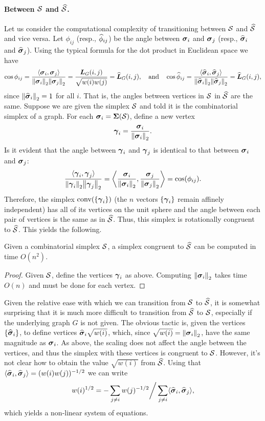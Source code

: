 \paragraph{Between \texorpdfstring{$\mathcal{S}$}{the combinatorial} and \texorpdfstring{$\widehat{\mathcal{S}}$}{normalized simplex}.}
Let us consider the computational complexity of transitioning between $\mathcal{S}$ and $\widehat{\mathcal{S}}$ and vice versa. Let $\phi_{ij}$ (resp., $\widehat{\phi}_{ij}$) be the angle between $\vb*{\sigma}_i$ and $\vb*{\sigma}_j$ (resp., $\widehat{\vb*{\sigma}}_i$ and $\widehat{\vb*{\sigma}}_j$). Using the typical formula for the dot product in Euclidean space we have
\begin{equation*}
\cos\phi_{ij} = \frac{\langle \vb*{\sigma}_i,\vb*{\sigma}_j\rangle }{\norm{\vb*{\sigma}_i}_2\norm{\vb*{\sigma}_j}_2} = \frac{\vb*{L}_G(i,j)}{\sqrt{w(i)w(j)}} = \widehat{\vb*{L}}_G(i,j), \quad\text{and}\quad \cos\widehat{\phi}_{ij} = \frac{\langle \widehat{\vb*{\sigma}}_i,\widehat{\vb*{\sigma}}_j\rangle }{\norm{\widehat{\vb*{\sigma}}_i}_2\norm{\widehat{\vb*{\sigma}}_j}_2} = \widehat{\vb*{L}}_G(i,j),
\end{equation*}
since  $\norm{\widehat{\vb*{\sigma}}_i}_2=1$ for all $i$. 
That is, the angles between vertices in $\mathcal{S}$ in $\widehat{\mathcal{S}}$ are the same. Suppose we are given the simplex $\mathcal{S}$ and told it is the combinatorial simplex of a graph. For each $\vb*{\sigma}_i = \boldsymbol{\Sigma}(\mathcal{S})$, define a new vertex 
\[\vb*{\gamma}_i = \frac{\vb*{\sigma}_i}{\norm{\vb*{\sigma}_i}_2}.\]
Is it evident that the angle between $\vb*{\gamma}_i$ and $\vb*{\gamma}_j$ is identical to that between $\vb*{\sigma}_i$ and $\vb*{\sigma}_j$: 
\begin{equation*}
\frac{\langle \vb*{\gamma}_i,\vb*{\gamma}_j\rangle}{\norm{\vb*{\gamma}_i}_2\norm{\vb*{\gamma}_j}_2} = \bigg\langle \frac{\vb*{\sigma}_i}{\norm{\vb*{\sigma}_i}_2},\frac{\vb*{\sigma}_j}{\norm{\vb*{\sigma}_j}_2}\bigg\rangle = \cos(\phi_{ij}).
\end{equation*}
 Therefore, the simplex  $\textnormal{conv}(\{\vb*{\gamma}_i\})$ (the $n$ vectors $\{\vb*{\gamma}_i\}$ remain affinely independent) has all of its vertices on the unit sphere and the angle  between each pair of vertices is the  same as in $\widehat{\mathcal{S}}$. Thus, this simplex is rotationally congruent  to $\widehat{\mathcal{S}}$. This yields the following.

\begin{lemma}
	Given a combinatorial simplex $\mathcal{S}$, a simplex congruent to $\widehat{\mathcal{S}}$ can be computed in time $O(n^2)$. 
\end{lemma}
\begin{proof}
	Given $\mathcal{S}$, define the vertices $\vb*{\gamma}_i$ as above. Computing $\norm{\vb*{\sigma}_i}_2$ takes time $O(n)$ and must be done for each vertex. 
\end{proof}

Given the relative ease with which we can transition from $\mathcal{S}$ to $\widehat{\mathcal{S}}$, it is somewhat surprising that it is much more difficult to transition from $\widehat{\mathcal{S}}$ to  $\mathcal{S}$, especially if the underlying graph $G$ is not given. The obvious tactic is, given the vertices $\{\widehat{\vb*{\sigma}}_i\}$, to define vertices $\widehat{\vb*{\sigma}}_i \sqrt{w(i)}$, which, since $\sqrt{w(i)}=\norm{\vb*{\sigma}_i}_2$, have the same magnitude as $\vb*{\sigma}_i$. As above, the scaling does not affect the angle between the vertices, and thus the simplex with these vertices is congruent to $\mathcal{S}$. However, it's not clear how to obtain the value $\sqrt{w(i)}$ from $\widehat{\mathcal{S}}$. Using that $\langle \widehat{\vb*{\sigma}}_i,\widehat{\vb*{\sigma}}_j\rangle =(w(i)w(j))^{-1/2}$ we can write 
\[w(i)^{1/2} = -\sum_{j\neq i}w(j)^{-1/2} \bigg/ \sum_{j\neq i}\langle \widehat{\vb*{\sigma}}_i,\widehat{\vb*{\sigma}}_j\rangle,\]
which yields a non-linear system of equations. 

